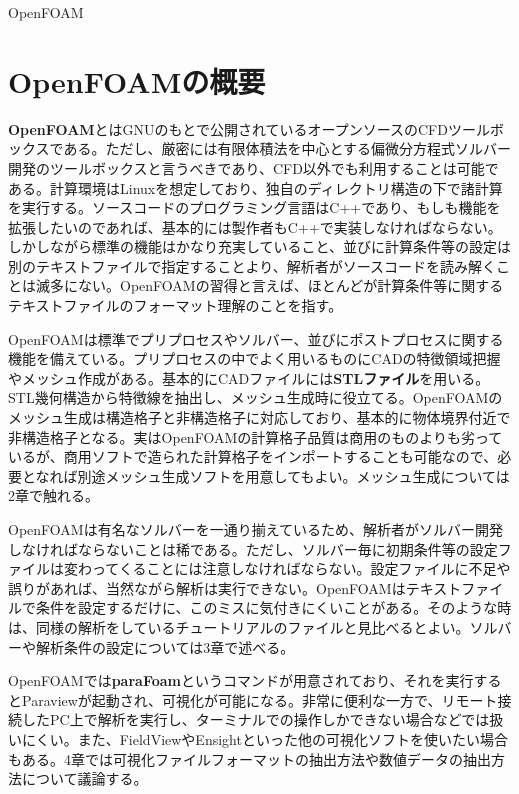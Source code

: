 \documentclass[dvipdfmx, 9pt, a4paper]{jsarticle}
\numberwithin{equation}{section}
\begin{document}
\begin{center}
{\fontsize{18pt}{1pt}\selectfont OpenFOAM}\\
\end{center}

\section{OpenFOAMの概要}
{\bf OpenFOAM}とはGNUのもとで公開されているオープンソースのCFDツールボックスである。ただし、厳密には有限体積法を中心とする偏微分方程式ソルバー開発のツールボックスと言うべきであり、CFD以外でも利用することは可能である。計算環境はLinuxを想定しており、独自のディレクトリ構造の下で諸計算を実行する。ソースコードのプログラミング言語はC++であり、もしも機能を拡張したいのであれば、基本的には製作者もC++で実装しなければならない。しかしながら標準の機能はかなり充実していること、並びに計算条件等の設定は別のテキストファイルで指定することより、解析者がソースコードを読み解くことは滅多にない。OpenFOAMの習得と言えば、ほとんどが計算条件等に関するテキストファイルのフォーマット理解のことを指す。\par
OpenFOAMは標準でプリプロセスやソルバー、並びにポストプロセスに関する機能を備えている。プリプロセスの中でよく用いるものにCADの特徴領域把握やメッシュ作成がある。基本的にCADファイルには{\bf STLファイル}を用いる。STL幾何構造から特徴線を抽出し、メッシュ生成時に役立てる。OpenFOAMのメッシュ生成は構造格子と非構造格子に対応しており、基本的に物体境界付近で非構造格子となる。実はOpenFOAMの計算格子品質は商用のものよりも劣っているが、商用ソフトで造られた計算格子をインポートすることも可能なので、必要となれば別途メッシュ生成ソフトを用意してもよい。メッシュ生成については2章で触れる。\par
OpenFOAMは有名なソルバーを一通り揃えているため、解析者がソルバー開発しなければならないことは稀である。ただし、ソルバー毎に初期条件等の設定ファイルは変わってくることには注意しなければならない。設定ファイルに不足や誤りがあれば、当然ながら解析は実行できない。OpenFOAMはテキストファイルで条件を設定するだけに、このミスに気付きにくいことがある。そのような時は、同様の解析をしているチュートリアルのファイルと見比べるとよい。ソルバーや解析条件の設定については3章で述べる。\par
OpenFOAMでは{\bf paraFoam}というコマンドが用意されており、それを実行するとParaviewが起動され、可視化が可能になる。非常に便利な一方で、リモート接続したPC上で解析を実行し、ターミナルでの操作しかできない場合などでは扱いにくい。また、FieldViewやEnsightといった他の可視化ソフトを使いたい場合もある。4章では可視化ファイルフォーマットの抽出方法や数値データの抽出方法について議論する。
\end{document}

